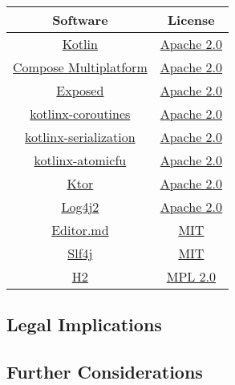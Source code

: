 \documentclass[a4paper]{article}
\begin{document}
    \begin{table}[H]
        \begin{tabular}{c|c}
            Software                                                                         & License                                                                                       \\
            \hline
            \href{https://github.com/JetBrains/kotlin}{Kotlin}                               & \href{https://github.com/JetBrains/kotlin/blob/master/license/LICENSE.txt}{Apache 2.0}        \\
            \href{https://github.com/JetBrains/compose-multiplatform}{Compose Multiplatform} & \href{https://github.com/JetBrains/compose-multiplatform/blob/master/LICENSE.txt}{Apache 2.0} \\
            \href{https://github.com/JetBrains/Exposed}{Exposed}                             & \href{https://github.com/JetBrains/Exposed/blob/main/LICENSE.txt}{Apache 2.0}                 \\
            \href{https://github.com/Kotlin/kotlinx.coroutines}{kotlinx-coroutines}          & \href{https://github.com/Kotlin/kotlinx.coroutines/blob/master/LICENSE.txt}{Apache 2.0}       \\
            \href{https://github.com/Kotlin/kotlinx.serialization}{kotlinx-serialization}    & \href{https://github.com/Kotlin/kotlinx.serialization/blob/master/LICENSE.txt}{Apache 2.0}    \\
            \href{https://github.com/Kotlin/kotlinx-atomicfu}{kotlinx-atomicfu}              & \href{https://github.com/Kotlin/kotlinx-atomicfu/blob/master/LICENSE.txt}{Apache 2.0}         \\
            \href{https://github.com/ktorio/ktor}{Ktor}                                      & \href{https://github.com/ktorio/ktor/blob/main/LICENSE}{Apache 2.0}                           \\
            \href{https://github.com/apache/logging-log4j2}{Log4j2}                          & \href{https://github.com/apache/logging-log4j2/blob/2.x/LICENSE.txt}{Apache 2.0}              \\
            \href{https://github.com/pandao/editor.md}{Editor.md}                            & \href{https://github.com/pandao/editor.md/blob/master/LICENSE}{MIT}                           \\
            \href{https://github.com/qos-ch/slf4j}{Slf4j}                                    & \href{https://github.com/qos-ch/slf4j/blob/master/LICENSE.txt}{MIT}                           \\
            \href{https://www.h2database.com/html/main.html}{H2}                             & \href{https://www.h2database.com/html/license.html}{MPL 2.0}                                  \\
        \end{tabular}
    \end{table}

    \subsection*{Legal Implications}

    \subsection*{Further Considerations}
\end{document}
